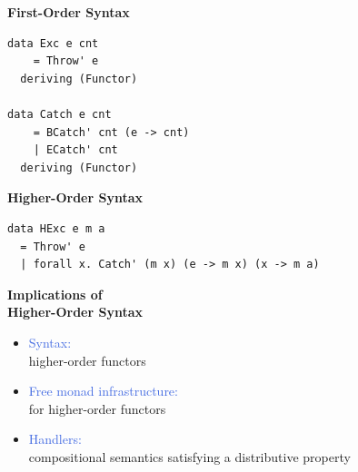 \documentclass[xcolor=pdftex,dvipsnames,table]{beamer}
\begin{document}
\begin{frame}[t, fragile]
  \begin{center}
    \textbf{\Large{First-Order Syntax}}
  \end{center}
  \begin{verbatim}
data Exc e cnt
    = Throw' e
  deriving (Functor)

data Catch e cnt
    = BCatch' cnt (e -> cnt)
    | ECatch' cnt
  deriving (Functor)
  \end{verbatim}
  \begin{center}
    \textbf{\Large{Higher-Order Syntax}}
  \end{center}
  \begin{verbatim}
data HExc e m a
  = Throw' e
  | forall x. Catch' (m x) (e -> m x) (x -> m a)
  \end{verbatim}
\end{frame}

\begin{frame}[t, fragile]
  \begin{center}
    \textbf{\Large{Implications of \\ Higher-Order Syntax}}
  \end{center}
  \bigskip
  \begin{itemize}
      \item \textcolor{RoyalBlue}{Syntax:}\\ higher-order functors
      \item \textcolor{RoyalBlue}{Free monad infrastructure:}\\ for higher-order functors
      \item \textcolor{RoyalBlue}{Handlers:}\\ compositional semantics satisfying a distributive property
  \end{itemize}

\end{frame}
\end{document}
